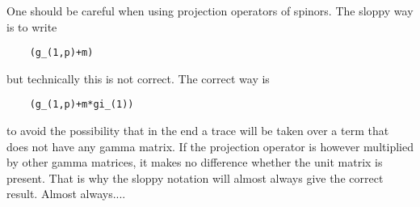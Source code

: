 One should be careful when using projection operators of spinors. The 
sloppy way is to write
\begin{verbatim}
    (g_(1,p)+m)
\end{verbatim}
but technically this is not correct. The correct way is
\begin{verbatim}
    (g_(1,p)+m*gi_(1))
\end{verbatim}
to avoid the possibility that in the end a trace will be taken over a term 
that does not have any gamma matrix. If the projection operator is however 
multiplied by other gamma matrices, it makes no difference whether the unit 
matrix is present. That is why the sloppy notation will almost always give 
the correct result. Almost always....
